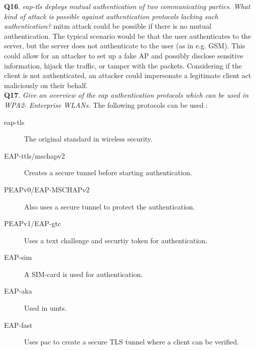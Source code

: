 \documentclass[a4paper,11pt]{article}
\begin{document}
\noindent \textbf{Q16}. \textit{\gls{eap}-\gls{tls} deploys mutual authentication of two communicating parties. What kind of attack is possible against authentication protocols lacking such authentication?} \gls{mitm} attack could be possible if there is no mutual authentication. The typical scenario would be that the user authenticates to the server, but the server does not authenticate to the user (as in e.g. GSM). This could allow for an attacker to set up a fake AP and possibly disclose sensitive information, hijack the traffic, or tamper with the packets. Considering if the client is not authenticated, an attacker could impersonate a legitimate client act maliciously on their behalf. \\

\noindent \textbf{Q17}. \textit{Give an overview of the \gls{eap} authentication protocols which can be used in WPA2- Enterprise WLANs.} The following protocols can be used \cite{wpawiki}:

\begin{description}
\item [\gls{eap}-\gls{tls}]The original standard in wireless security.

\item [EAP-\gls{ttls}/\gls{mschap}v2] Creates a secure tunnel before starting authentication.

\item [PEAPv0/EAP-MSCHAPv2] Also uses a secure tunnel to protect the authentication.

\item [PEAPv1/EAP-\gls{gtc}] Uses a text challenge and securtiy token for authentication.

\item [EAP-\gls{sim}] A SIM-card is used for authentication.

\item [EAP-\gls{aka}] Used in \gls{umts}.

\item [EAP-\gls{fast}] Uses \gls{pac} to create a secure TLS tunnel where a client can be verified.
\end{description}
\end{document}
